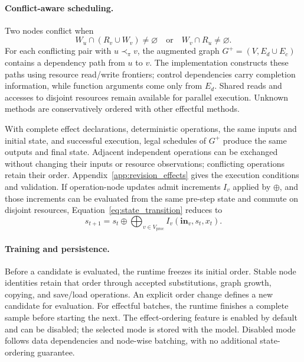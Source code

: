 \paragraph{Conflict-aware scheduling.}
Two nodes conflict when
\begin{equation}
W_u\cap(R_v\cup W_v)\ne\varnothing
\quad\text{or}\quad W_v\cap R_u\ne\varnothing.
\end{equation}
For each conflicting pair with $u\prec_\pi v$, the augmented graph $G^+=(V,E_d\cup E_c)$ contains a dependency path from $u$ to $v$. The implementation constructs these paths using resource read/write frontiers; control dependencies carry completion information, while function arguments come only from $E_d$. Shared reads and accesses to disjoint resources remain available for parallel execution. Unknown methods are conservatively ordered with other effectful methods.

With complete effect declarations, deterministic operations, the same inputs and initial state, and successful execution, legal schedules of $G^+$ produce the same outputs and final state. Adjacent independent operations can be exchanged without changing their inputs or resource observations; conflicting operations retain their order. Appendix~\ref{app:revision_effects} gives the execution conditions and validation. If operation-node updates admit increments $I_v$ applied by $\oplus$, and those increments can be evaluated from the same pre-step state and commute on disjoint resources, Equation~\ref{eq:state_transition} reduces to
\begin{equation}
\label{eq:state_parallel}
s_{t+1}=s_t\oplus\bigoplus_{v\in V_{\mathrm{proc}}} I_v(\mathbf{in}_v,s_t,x_t).
\end{equation}

\paragraph{Training and persistence.}
Before a candidate is evaluated, the runtime freezes its initial order. Stable node identities retain that order through accepted substitutions, graph growth, copying, and save/load operations. An explicit order change defines a new candidate for evaluation. For effectful batches, the runtime finishes a complete sample before starting the next. The effect-ordering feature is enabled by default and can be disabled; the selected mode is stored with the model. Disabled mode follows data dependencies and node-wise batching, with no additional state-ordering guarantee.


